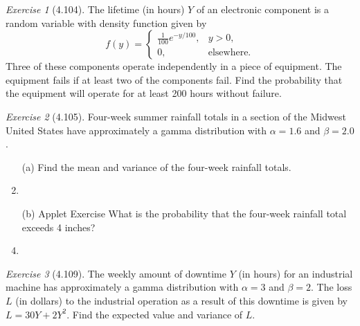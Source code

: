 \documentclass[12pt]{amsart}
\makeatletter
\theoremstyle{remark}
\newtheorem*{exercise}{Exercise}%
\renewenvironment{proof}[1][\proofname]{\par\doublespacing
  \pushQED{\qed}%
  \normalfont \topsep6\p@\@plus6\p@\relax
  \list{}{%
    \settowidth{\leftmargin}{\itshape\proofname:\hskip\labelsep}%
    \setlength{\labelwidth}{0pt}%
    \setlength{\itemindent}{-\leftmargin}%
  }%
  \item[\hskip\labelsep\itshape#1\@addpunct{:}]\ignorespaces
}{%
  \popQED\endlist\@endpefalse
  \singlespacing
}
\theoremstyle{mycomment}
\makeatother
\begin{document}
\begin{exercise}[4.104]
The lifetime (in hours) $Y$ of an electronic component is a random variable with density function given by
$$f(y) = \begin{cases}
\frac{1}{100}e^{-y/100}, & y > 0, \\
0, & \text{elsewhere}.
\end{cases}$$
Three of these components operate independently in a piece of equipment. The equipment fails if at least two of the components fail. Find the probability that the equipment will operate for at least 200 hours without failure.

\begin{proof}[Solution]
 
\end{proof}
\end{exercise}

\begin{exercise}[4.105]
Four-week summer rainfall totals in a section of the Midwest United States have approximately a gamma distribution with $\alpha = 1.6$ and $\beta = 2.0$.

\begin{enumerate}
    \item[(a)] Find the mean and variance of the four-week rainfall totals.
\begin{proof}[Solution]
 
\end{proof}
    \item[(b)] Applet Exercise What is the probability that the four-week rainfall total exceeds 4 inches?
\begin{proof}[Solution]
 
\end{proof}
\end{enumerate}
\end{exercise}

\begin{exercise}[4.109]
The weekly amount of downtime $Y$ (in hours) for an industrial machine has approximately a gamma distribution with $\alpha = 3$ and $\beta = 2$. The loss $L$ (in dollars) to the industrial operation as a result of this downtime is given by $L = 30Y + 2Y^2$. Find the expected value and variance of $L$.

\begin{proof}[Solution]
 
\end{proof}
\end{exercise}
\end{document}

